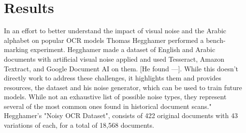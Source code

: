 \documentclass[sigplan,screen,nonacm]{acmart-tagged}
\begin{document}


\section{Results}
\label{sec:Results}
In an effort to better understand the impact of visual noise and the Arabic alphabet on popular OCR models Thomas Hegghamer performed a bench-marking experiment. Hegghamer made a dataset of English and Arabic documents with artificial visual noise applied and used Tesseract, Amazon Textract, and Google Document AI on them. [He found ---]. While this doesn't directly work to address these challenges, it highlights them and provides resources, the dataset and his noise generator, which can be used to train future models. While not an exhaustive list of possible noise types, they represent several of the most common ones found in historical document scans."\citep{Hegghamer:2022} Hegghamer's "Noisy OCR Dataset", consists of 422 original documents with 43 variations of each, for a total of 18,568 documents.

\end{document}

